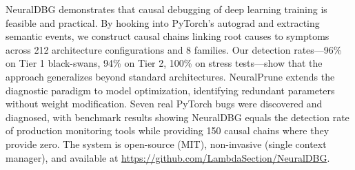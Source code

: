\documentclass[11pt]{article}
\begin{document}
NeuralDBG demonstrates that causal debugging of deep learning training is feasible and practical. By hooking into PyTorch's autograd and extracting semantic events, we construct causal chains linking root causes to symptoms across 212 architecture configurations and 8 families. Our detection rates—96\% on Tier 1 black-swans, 94\% on Tier 2, 100\% on stress tests—show that the approach generalizes beyond standard architectures. NeuralPrune extends the diagnostic paradigm to model optimization, identifying redundant parameters without weight modification. Seven real PyTorch bugs were discovered and diagnosed, with benchmark results showing NeuralDBG equals the detection rate of production monitoring tools while providing 150 causal chains where they provide zero. The system is open-source (MIT), non-invasive (single context manager), and available at \url{https://github.com/LambdaSection/NeuralDBG}.

\end{document}
